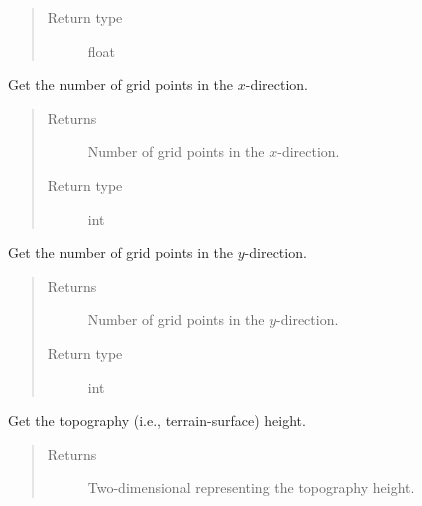 \documentclass[letterpaper,10pt,english]{sphinxmanual}
\begin{document}
\begin{fulllineitems}
\begin{fulllineitems}
\begin{quote}
\begin{description}
\item[{Return type}] \leavevmode
float

\end{description}\end{quote}

\end{fulllineitems}


\begin{fulllineitems}
\label{\detokenize{api:grids.grid_xyz.GridXYZ.nx}}
Get the number of grid points in the \(x\)-direction.
\begin{quote}\begin{description}
\item[{Returns}] \leavevmode
Number of grid points in the \(x\)-direction.

\item[{Return type}] \leavevmode
int

\end{description}\end{quote}

\end{fulllineitems}


\begin{fulllineitems}
\label{\detokenize{api:grids.grid_xyz.GridXYZ.ny}}
Get the number of grid points in the \(y\)-direction.
\begin{quote}\begin{description}
\item[{Returns}] \leavevmode
Number of grid points in the \(y\)-direction.

\item[{Return type}] \leavevmode
int

\end{description}\end{quote}

\end{fulllineitems}


\begin{fulllineitems}
\label{\detokenize{api:grids.grid_xyz.GridXYZ.topography_height}}
Get the topography (i.e., terrain-surface) height.
\begin{quote}\begin{description}
\item[{Returns}] \leavevmode
Two-dimensional  representing the topography height.


\end{description}
\end{quote}
\end{fulllineitems}
\end{fulllineitems}
\end{document}
